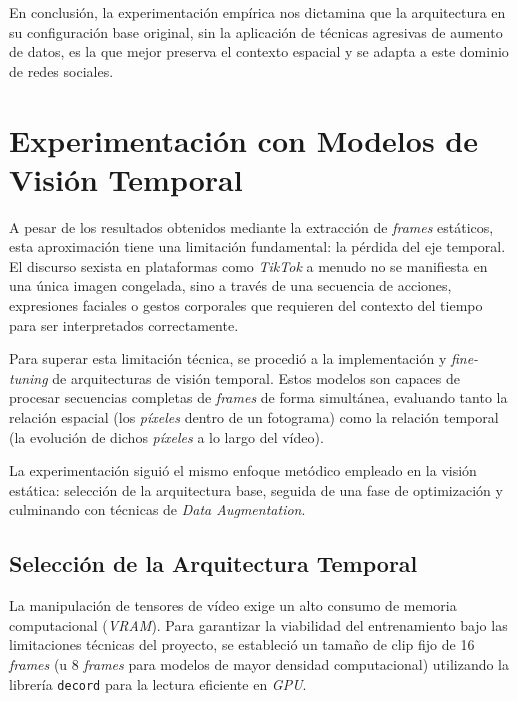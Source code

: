 En conclusión, la experimentación empírica nos dictamina que la arquitectura en su configuración base original, sin la aplicación de técnicas agresivas de aumento de datos, es la que mejor preserva el contexto espacial y se adapta a este dominio de redes sociales.

\section{Experimentación con Modelos de Visión Temporal}
\label{sec:ExperimentacionConModelosDeVisionTemporal}
A pesar de los resultados obtenidos mediante la extracción de \textit{frames} estáticos, esta aproximación tiene una limitación fundamental: la pérdida del eje temporal. El discurso sexista en plataformas como \textit{TikTok} a menudo no se manifiesta en una única imagen congelada, sino a través de una secuencia de acciones, expresiones faciales o gestos corporales que requieren del contexto del tiempo para ser interpretados correctamente. 

Para superar esta limitación técnica, se procedió a la implementación y \textit{fine-tuning} de arquitecturas de visión temporal. Estos modelos son capaces de procesar secuencias completas de \textit{frames} de forma simultánea, evaluando tanto la relación espacial (los \textit{píxeles} dentro de un fotograma) como la relación temporal (la evolución de dichos \textit{píxeles} a lo largo del vídeo). 

La experimentación siguió el mismo enfoque metódico empleado en la visión estática: selección de la arquitectura base, seguida de una fase de optimización y culminando con técnicas de \textit{Data Augmentation}. 

\subsection{Selección de la Arquitectura Temporal}
\label{subsec:SeleccionDeLaArquitecturaTemporal}
La manipulación de tensores de vídeo exige un alto consumo de memoria computacional (\textit{VRAM}). Para garantizar la viabilidad del entrenamiento bajo las limitaciones técnicas del proyecto, se estableció un tamaño de clip fijo de 16 \textit{frames} (u 8 \textit{frames} para modelos de mayor densidad computacional) utilizando la librería \texttt{decord} para la lectura eficiente en \textit{GPU}. 

